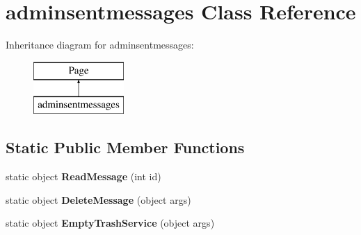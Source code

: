 \hypertarget{classadminsentmessages}{\section{adminsentmessages Class Reference}
\label{classadminsentmessages}
}
Inheritance diagram for adminsentmessages\-:\begin{figure}[H]
\begin{center}
\leavevmode
\includegraphics[height=2.000000cm]{classadminsentmessages}
\end{center}
\end{figure}
\subsection*{Static Public Member Functions}
\begin{DoxyCompactItemize}
\item 
\hypertarget{classadminsentmessages_ae3e3185b9751f6aef6fe832c6995d17f}{static object {\bfseries Read\-Message} (int id)}\label{classadminsentmessages_ae3e3185b9751f6aef6fe832c6995d17f}

\item 
\hypertarget{classadminsentmessages_a970719d48af108e5e98e8bb6ed61d0c0}{static object {\bfseries Delete\-Message} (object args)}\label{classadminsentmessages_a970719d48af108e5e98e8bb6ed61d0c0}

\item 
\hypertarget{classadminsentmessages_aea658fbdfd1eee4bfa4cea2a42735490}{static object {\bfseries Empty\-Trash\-Service} (object args)}\label{classadminsentmessages_aea658fbdfd1eee4bfa4cea2a42735490}

\end{DoxyCompactItemize}
